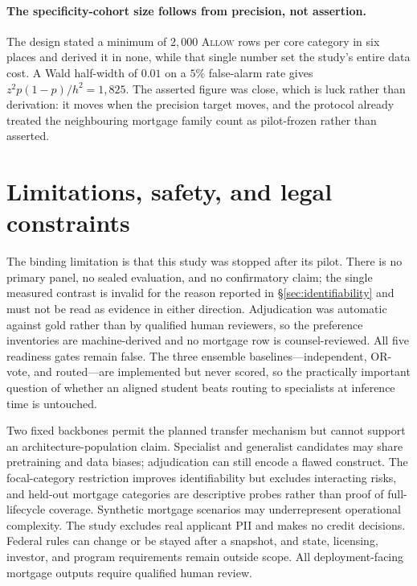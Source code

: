 \documentclass[10pt]{article}
\newcommand{\allow}{\textsc{Allow}}
\begin{document}
\paragraph{The specificity-cohort size follows from precision, not assertion.}
The design stated a minimum of $2{,}000$ \allow{} rows per core category in six places
and derived it in none, while that single number set the study's entire data cost. A
Wald half-width of $0.01$ on a $5\%$ false-alarm rate gives $z^2p(1-p)/h^2 = 1{,}825$.
The asserted figure was close, which is luck rather than derivation: it moves when the
precision target moves, and the protocol already treated the neighbouring mortgage
family count as pilot-frozen rather than asserted.

\section{Limitations, safety, and legal constraints}

The binding limitation is that this study was stopped after its pilot. There is no
primary panel, no sealed evaluation, and no confirmatory claim; the single measured
contrast is invalid for the reason reported in \S\ref{sec:identifiability} and must not
be read as evidence in either direction. Adjudication was automatic against gold rather
than by qualified human reviewers, so the preference inventories are machine-derived and
no mortgage row is counsel-reviewed. All five readiness gates remain false. The three
ensemble baselines---independent, OR-vote, and routed---are implemented but never
scored, so the practically important question of whether an aligned student beats
routing to specialists at inference time is untouched.

Two fixed backbones permit the planned transfer mechanism but cannot support an
architecture-population claim. Specialist and generalist candidates may share
pretraining and data biases; adjudication can still encode a flawed construct.
The focal-category restriction improves identifiability but excludes interacting
risks, and held-out mortgage categories are descriptive probes rather than proof
of full-lifecycle coverage. Synthetic mortgage scenarios may underrepresent
operational complexity. The study excludes real applicant PII and makes no
credit decisions. Federal rules can change or be stayed after a snapshot, and
state, licensing, investor, and program requirements remain outside scope. All
deployment-facing mortgage outputs require qualified human review.
\end{document}
